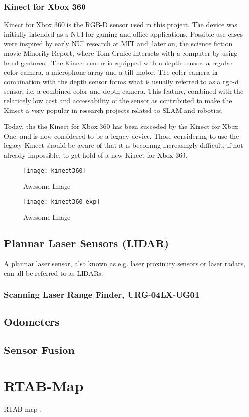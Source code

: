 \subsubsection{Kinect for Xbox 360}

Kinect for Xbox 360 is the RGB-D sensor used in this project. The device was initially intended as a \ac{NUI} for gaming and office applications. Possible use cases were inspired by early \ac{NUI} research at \ac{MIT} and, later on, the science fiction movie Minority Report, where Tom Cruice interacts with a computer by using hand gestures \cite{kinect_book}. The Kinect sensor is equipped with a depth sensor, a regular color camera, a microphone array and a tilt motor. The color camera in combination with the depth sensor forms what is usually referred to as a rgb-d sensor, i.e. a combined color and depth camera. This feature, combined with the relaticely low cost and accessability of the sensor as contributed to make the Kinect a very popular in research projects related to \ac{SLAM} and robotics.

Today, the the Kinect for Xbox 360 has been succeded by the Kinect for Xbox One, and is now considered to be a legacy device. Those considering to use the legacy Kinect should be aware of that it is becoming increasingly difficult, if not already impossible, to get hold of a new Kinect for Xbox 360. 

\begin{figure}[p]
    \centering
    \texttt{[image: kinect360]}
    \caption{Awesome Image}
    \label{fig:kinect360}
\end{figure}

\begin{figure}[p]
    \centering
    \texttt{[image: kinect360\_exp]}
    \caption{Awesome Image}
    \label{fig:kinect360_exp}
\end{figure}


\subsection{Plannar Laser Sensors (LIDAR)}

A plannar laser sensor, also known as e.g. laser proximity sensors or laser radars, can all be referred to as LIDARs. 

\subsubsection{Scanning Laser Range Finder, URG-04LX-UG01}


\subsection{Odometers}

\subsection{Sensor Fusion}


\section{RTAB-Map}

\ac{RTAB-map} \cite{RTAB_map}.